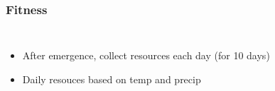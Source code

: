 \documentclass[pdf]{beamer}
\begin{document}
\begin{frame}
\frametitle{Fitness}
\begin{columns}

\begin{itemize}
 \item After emergence, collect resources each day (for 10 days)
 \item Daily resouces based on temp and precip
\end{itemize}




\end{columns}
\end{frame}
\end{document}

